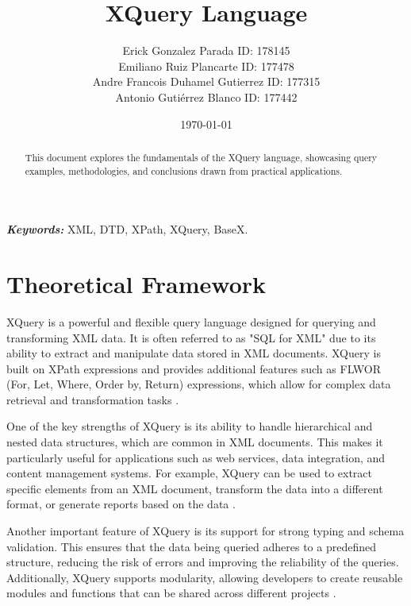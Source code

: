 \documentclass[twoside]{article}
\begin{document}

\title{XQuery Language}
\author{\small{Erick Gonzalez Parada ID: 178145}\\
	\small{Emiliano Ruiz Plancarte ID: 177478} \\
	\small{Andre Francois Duhamel Gutierrez ID: 177315} \\
\small{Antonio Gutiérrez Blanco ID: 177442}}
\date{\today}
\maketitle

\begin{abstract}
	\raggedright
	This document explores the fundamentals of the XQuery language, showcasing query examples, methodologies, and conclusions drawn from practical applications.
\end{abstract}

\begin{justify}
	\textbf{\textit{Keywords:}} XML, DTD, XPath, XQuery, BaseX.
\end{justify}

\section{Theoretical Framework}
XQuery is a powerful and flexible query language designed for querying and transforming XML data. It is often referred to as "SQL for XML" due to its ability to extract and manipulate data stored in XML documents. XQuery is built on XPath expressions and provides additional features such as FLWOR (For, Let, Where, Order by, Return) expressions, which allow for complex data retrieval and transformation tasks \cite{w3}.

One of the key strengths of XQuery is its ability to handle hierarchical and nested data structures, which are common in XML documents. This makes it particularly useful for applications such as web services, data integration, and content management systems. For example, XQuery can be used to extract specific elements from an XML document, transform the data into a different format, or generate reports based on the data \cite{microsoft}.

Another important feature of XQuery is its support for strong typing and schema validation. This ensures that the data being queried adheres to a predefined structure, reducing the risk of errors and improving the reliability of the queries. Additionally, XQuery supports modularity, allowing developers to create reusable modules and functions that can be shared across different projects \cite{w3schools}.
\end{document}
